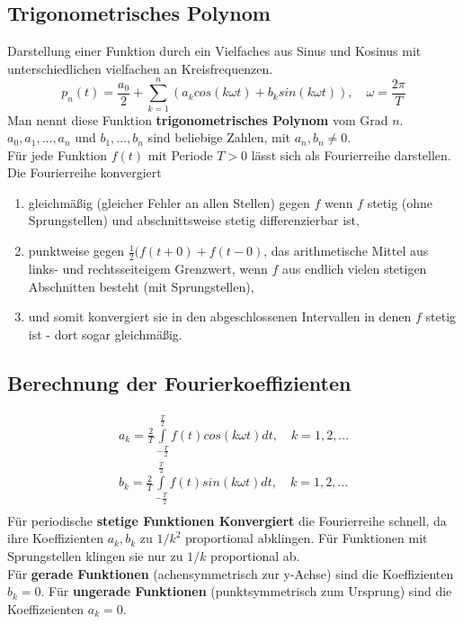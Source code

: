 \documentclass[12pt]{article}
\begin{document}
\subsection{Trigonometrisches Polynom}
Darstellung einer Funktion durch ein Vielfaches aus Sinus und Kosinus mit unterschiedlichen vielfachen an Kreisfrequenzen.
\begin{equation*}
	p_n(t)=\frac{a_0}{2}+\sum\limits_{k=1}^n(a_kcos(k\omega t)+b_ksin(k\omega t)), \quad \omega=\frac{2\pi}{T}
\end{equation*}
Man nennt diese Funktion \textbf{trigonometrisches Polynom} vom Grad $n$. $a_0,a_1,...,a_n$ und $b_1,...,b_n$ sind beliebige Zahlen, mit $a_n, b_n \neq 0$.\\
Für jede Funktion $f(t)$ mit Periode $T>0$ lässt sich als Fourierreihe darstellen.\\
Die Fourierreihe konvergiert
\begin{enumerate}
	\item gleichmäßig (gleicher Fehler an allen Stellen) gegen $f$ wenn $f$ stetig (ohne Sprungstellen) und abschnittsweise stetig differenzierbar ist,
	\item punktweise gegen $\frac{1}{2}(f(t+0)+f(t-0)$, das arithmetische Mittel aus links- und rechtsseiteigem Grenzwert, wenn $f$ aus endlich vielen stetigen Abschnitten besteht (mit Sprungstellen),
	\item und somit konvergiert sie in den abgeschlossenen Intervallen in denen $f$ stetig ist - dort sogar gleichmäßig.
\end{enumerate}
\subsection{Berechnung der Fourierkoeffizienten}
\begin{gather*}
	a_k=\frac{2}{T}\int\limits_{-\frac{T}{2}}^{\frac{T}{2}}f(t)cos(k\omega t)dt, \quad k=1,2,...\\
	b_k=\frac{2}{T}\int\limits_{-\frac{T}{2}}^{\frac{T}{2}}f(t)sin(k\omega t)dt, \quad k=1,2,...\\
\end{gather*}
Für periodische \textbf{stetige Funktionen Konvergiert} die Fourierreihe schnell, da ihre Koeffizienten $a_k,b_k$ zu $1/k^2$ proportional abklingen. Für Funktionen mit Sprungstellen klingen sie nur zu $1/k$ proportional ab.\\
Für \textbf{gerade Funktionen} (achensymmetrisch zur y-Achse) sind die Koeffizienten $b_k = 0$. Für \textbf{ungerade Funktionen} (punktsymmetrisch zum Ursprung) sind die Koeffizeienten $a_k = 0$.
\end{document}
